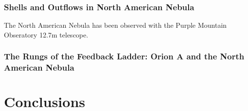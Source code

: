         \subsubsection{Shells and Outflows in North American Nebula}\label{sec:paper3}
        The North American Nebula has been observed with the Purple Mountain Obseratory 12.7m telescope. 
        \subsubsection{The Rungs of the Feedback Ladder: Orion A and the North American Nebula}\label{sec:paper4}
\section{Conclusions}\label{sec:conclusions}
    
    


  
  